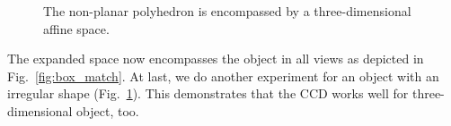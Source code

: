 \begin{figure}[htbp]
  \begin{minipage}[t]{0.5\linewidth} 
    \centering 
  \end{minipage} 
\caption[three-dimensional affine shape-space for rigid object]{The
  non-planar polyhedron is encompassed by a three-dimensional affine space.}
\label{fig:container}
\end{figure}

The expanded space now encompasses the object in all views as depicted
in Fig.~\ref{fig:box_match}. At last, we do
another experiment for an object with an irregular shape (Fig.~\ref{fig:container}). This
demonstrates that the CCD works well for three-dimensional object,
too.
